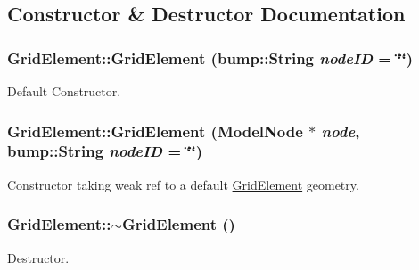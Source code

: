 \subsection{Constructor \& Destructor Documentation}
\hypertarget{class_grid_element_a87417c3c1fc9ff31fc96e402421937b6}{
\subsubsection[{GridElement}]{\setlength{\rightskip}{0pt plus 5cm}GridElement::GridElement (bump::String {\em nodeID} = {\ttfamily \char`\"{}\char`\"{}})}}
\label{class_grid_element_a87417c3c1fc9ff31fc96e402421937b6}
Default Constructor. \hypertarget{class_grid_element_a265cf8c55be6ebb01f8c56e092008504}{
\subsubsection[{GridElement}]{\setlength{\rightskip}{0pt plus 5cm}GridElement::GridElement (ModelNode $\ast$ {\em node}, \/  bump::String {\em nodeID} = {\ttfamily \char`\"{}\char`\"{}})}}
\label{class_grid_element_a265cf8c55be6ebb01f8c56e092008504}
Constructor taking weak ref to a default \hyperlink{class_grid_element}{GridElement} geometry. \hypertarget{class_grid_element_ae6cc4885751f3372bf96c4a4568e79fb}{
\subsubsection[{$\sim$GridElement}]{\setlength{\rightskip}{0pt plus 5cm}GridElement::$\sim$GridElement ()}}
\label{class_grid_element_ae6cc4885751f3372bf96c4a4568e79fb}
Destructor. 

